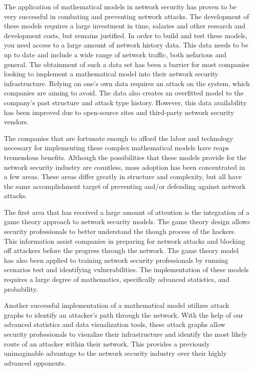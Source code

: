 \documentclass{article}
\begin{document}
The application of mathematical models in network security has proven to be very successful in combating and preventing network attacks. The development of these models requires a large investment in time, salaries and other research and development costs, but remains justified. In order to build and test these models, you need access to a large amount of network history data. This data needs to be up to date and include a wide range of network traffic, both nefarious and general. The obtainment of such a data set has been a barrier for most companies looking to implement a mathematical model into their network security infrastructure. Relying on one’s own data requires an attack on the system, which companies are aiming to avoid. The data also creates an overfitted model to the company’s past structure and attack type history. However, this data availability has been improved due to open-source sites and third-party network security vendors. 

The companies that are fortunate enough to afford the labor and technology necessary for implementing these complex mathematical models have reaps tremendous benefits. Although the possibilities that these models provide for the network security industry are countless, mass adoption has been concentrated in a few areas. These areas differ greatly in structure and complexity, but all have the same accomplishment target of preventing and/or defending against network attacks. 

The first area that has received a large amount of attention is the integration of a game theory approach to network security models. The game theory design allows security professionals to better understand the though process of the hackers. This information assist companies in preparing for network attacks and blocking off attackers before the progress through the network. The game theory model has also been applied to training network security professionals by running scenarios test and identifying vulnerabilities. The implementation of these models requires a large degree of mathematics, specifically advanced statistics, and probability.

Another successful implementation of a mathematical model utilizes attack graphs to identify an attacker’s path through the network. With the help of our advanced statistics and data visualization tools, these attack graphs allow security professionals to visualize their infrastructure and identify the most likely route of an attacker within their network. This provides a previously unimaginable advantage to the network security industry over their highly advanced opponents. 
\end{document}
